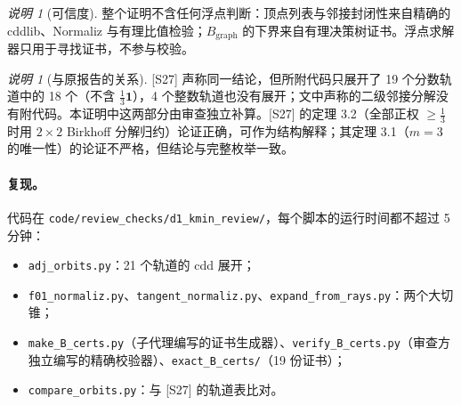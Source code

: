 \documentclass[11pt]{article}
\theoremstyle{remark}
\newtheorem{remark}[theorem]{说明}
\newcommand{\Bg}{B_{\mathrm{graph}}}
\begin{document}
\begin{remark}[可信度]
整个证明不含任何浮点判断：顶点列表与邻接封闭性来自精确的 cddlib、Normaliz 与有理比值检验；$\Bg$ 的下界来自有理决策树证书。浮点求解器只用于寻找证书，不参与校验。
\end{remark}

\begin{remark}[与原报告的关系]
[S27] 声称同一结论，但所附代码只展开了 19 个分数轨道中的 18 个（不含 $\tfrac13\mathbf 1$），4 个整数轨道也没有展开；文中声称的二级邻接分解没有附代码。本证明中这两部分由审查独立补算。[S27] 的定理 3.2（全部正权 $\ge\tfrac13$ 时用 $2\times2$ Birkhoff 分解归约）论证正确，可作为结构解释；其定理 3.1（$m=3$ 的唯一性）的论证不严格，但结论与完整枚举一致。
\end{remark}

\paragraph{复现。}代码在 \texttt{code/review\_checks/d1\_kmin\_review/}，每个脚本的运行时间都不超过 5 分钟：
\begin{itemize}
\item \texttt{adj\_orbits.py}：21 个轨道的 cdd 展开；
\item \texttt{f01\_normaliz.py}、\texttt{tangent\_normaliz.py}、\texttt{expand\_from\_rays.py}：两个大切锥；
\item \texttt{make\_B\_certs.py}（子代理编写的证书生成器）、\texttt{verify\_B\_certs.py}（审查方独立编写的精确校验器）、\texttt{exact\_B\_certs/}（19 份证书）；
\item \texttt{compare\_orbits.py}：与 [S27] 的轨道表比对。
\end{itemize}
\end{document}
